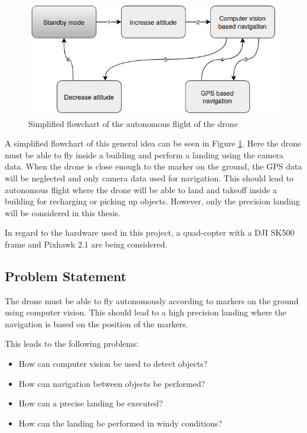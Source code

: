 \documentclass[../Head/Report.tex]{subfiles}
\begin{document}
\begin{figure}[H]
	\centering
	\includegraphics[height=5cm]{../Figures/simplifiedFlowchard.png}
	\captionsetup{justification=centering}
    \caption{Simplified flowchart of the autonomous flight of the drone  }
    \label{fig:simplifiedFlowchard}
\end{figure}

A simplified flowchart of this general idea can be seen in Figure \ref{fig:simplifiedFlowchard}. Here the drone must be able to fly inside a building and perform a landing using the camera data. When the drone is close enough to the marker on the ground, the GPS data will be neglected and only camera data used for navigation. This should lead to autonomous flight where the drone will be able to land and takeoff inside a building for recharging or picking up objects. However, only the precision landing will be considered in this thesis. 

In regard to the hardware used in this project, a quad-copter with a DJI SK500 frame and Pixhawk 2.1 are being considered.   



\subsection{Problem Statement}

The drone must be able to fly autonomously according to markers on the ground using computer vision. This should lead to a high precision landing where the navigation is based on the position of the markers. 

This leads to the following problems:

\begin{itemize}
    \item How can computer vision be used to detect objects?
    \item How can navigation between objects be performed?
    \item How can a precise landing be executed?
    \item How can the landing be performed in windy conditions?
    
\end{itemize} 
\end{document}
